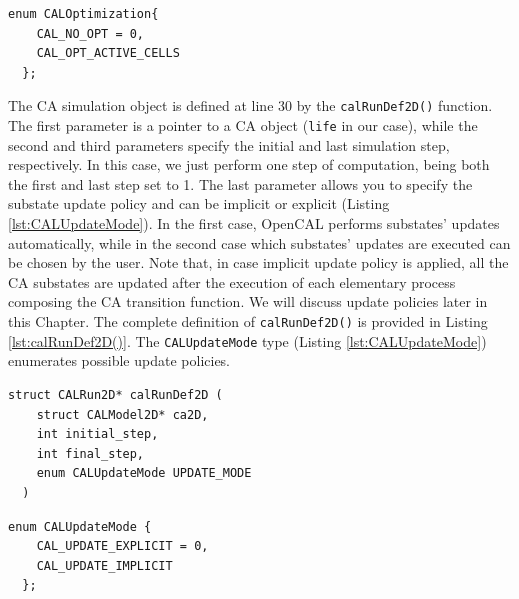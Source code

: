 \begin{lstlisting}[float,floatplacement=H, label=lst:CALOptimization, caption=The CALOptimization enum type., numbers=none]
  enum CALOptimization{
    CAL_NO_OPT = 0,
    CAL_OPT_ACTIVE_CELLS        
  };
\end{lstlisting}

The CA simulation object is defined at line 30 by the
\verb'calRunDef2D()' function. The first parameter is a pointer to a
CA object (\verb'life' in our case), while the second and third
parameters specify the initial and last simulation step,
respectively. In this case, we just perform one step of computation,
being both the first and last step set to 1. The last parameter allows
you to specify the substate update policy and can be implicit or
explicit (Listing \ref{lst:CALUpdateMode}). In the first case, OpenCAL
performs substates' updates automatically, while in the second case
which substates' updates are executed can be chosen by the user. Note
that, in case implicit update policy is applied, all the CA substates
are updated after the execution of each elementary process composing
the CA transition function. We will discuss update policies later in
this Chapter. The complete definition of \verb'calRunDef2D()' is
provided in Listing \ref{lst:calRunDef2D()}. The \verb'CALUpdateMode'
type (Listing \ref{lst:CALUpdateMode}) enumerates possible update
policies.

\begin{lstlisting}[float,floatplacement=H, label=lst:calRunDef2D(), caption=Definition of the calRunDef2D() function., numbers=none]
  struct CALRun2D* calRunDef2D (
    struct CALModel2D* ca2D,
    int initial_step,
    int final_step,
    enum CALUpdateMode UPDATE_MODE
  )	
\end{lstlisting}

\begin{lstlisting}[float,floatplacement=H, label=lst:CALUpdateMode, caption=The CALUpdateMode enum type., numbers=none]
  enum CALUpdateMode {
    CAL_UPDATE_EXPLICIT = 0,
    CAL_UPDATE_IMPLICIT
  };
\end{lstlisting}

